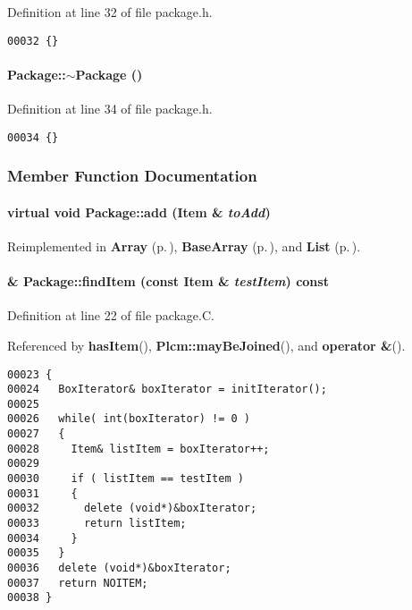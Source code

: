 Definition at line 32 of file package.h.\small\begin{verbatim}00032 {}
\end{verbatim}\normalsize 
\label{Package_a1}
\paragraph{\setlength{\rightskip}{0pt plus 5cm}Package::$\sim$Package ()\hspace{0.3cm}{\tt  [inline, virtual]}}\hfill



Definition at line 34 of file package.h.\small\begin{verbatim}00034 {}
\end{verbatim}\normalsize 


\subsubsection{Member Function Documentation}
\label{Package_a2}
\paragraph{\setlength{\rightskip}{0pt plus 5cm}virtual void Package::add ({\bf Item} \& {\em to\-Add})\hspace{0.3cm}{\tt  [pure virtual]}}\hfill



Reimplemented in {\bf Array} {\rm (p.\,\pageref{Array_a3})}, {\bf Base\-Array} {\rm (p.\,\pageref{BaseArray_a6})}, and {\bf List} {\rm (p.\,\pageref{List_a3})}.\label{Package_a5}
\paragraph{ \& Package::find\-Item (const {\bf Item} \& {\em test\-Item}) const\hspace{0.3cm}{\tt  [virtual]}}\hfill



Definition at line 22 of file package.C.

Referenced by {\bf has\-Item}(), {\bf Plcm::may\-Be\-Joined}(), and {\bf operator \&}().\small\begin{verbatim}00023 {
00024   BoxIterator& boxIterator = initIterator();
00025   
00026   while( int(boxIterator) != 0 )
00027   {
00028     Item& listItem = boxIterator++;
00029     
00030     if ( listItem == testItem )
00031     {
00032       delete (void*)&boxIterator;
00033       return listItem;
00034     }
00035   } 
00036   delete (void*)&boxIterator;
00037   return NOITEM;
00038 }
\end{verbatim}\normalsize 
\label{Package_a4}

